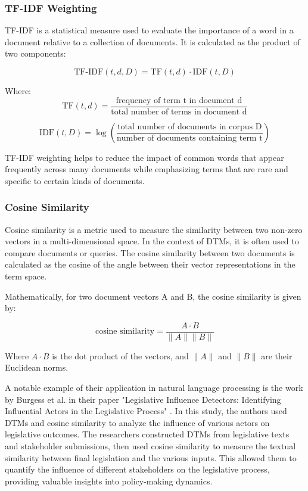 \documentclass[a4paper, oneside]{discothesis}
\begin{document}
\subsubsection{TF-IDF Weighting}
TF-IDF is a statistical measure used to evaluate the importance of a word in a document relative to a collection of documents. It is calculated as the product of two components:

\begin{equation}
\text{TF-IDF}(t,d,D) = \text{TF}(t,d) \cdot \text{IDF}(t,D)
\end{equation}

Where:
\begin{equation}
\text{TF}(t,d) = \frac{\text{frequency of term t in document d}}{\text{total number of terms in document d}}
\end{equation}

\begin{equation}
\text{IDF}(t,D) = \log\left(\frac{\text{total number of documents in corpus D}}{\text{number of documents containing term t}}\right)
\end{equation}

TF-IDF weighting helps to reduce the impact of common words that appear frequently across many documents while emphasizing terms that are rare and specific to certain kinds of documents.

\subsubsection{Cosine Similarity}
Cosine similarity is a metric used to measure the similarity between two non-zero vectors in a multi-dimensional space. In the context of DTMs, it is often used to compare documents or queries. The cosine similarity between two documents is calculated as the cosine of the angle between their vector representations in the term space.

Mathematically, for two document vectors A and B, the cosine similarity is given by:

\begin{equation}
\text{cosine similarity} = \frac{A \cdot B}{\|A\| \|B\|}
\end{equation}

Where $A \cdot B$ is the dot product of the vectors, and $\|A\|$ and $\|B\|$ are their Euclidean norms.

A notable example of their application in natural language processing is the work by Burgess et al. in their paper "Legislative Influence Detectors: Identifying Influential Actors in the Legislative Process" \cite{burgess2016legislative}. In this study, the authors used DTMs and cosine similarity to analyze the influence of various actors on legislative outcomes.
The researchers constructed DTMs from legislative texts and stakeholder submissions, then used cosine similarity to measure the textual similarity between final legislation and the various inputs. This allowed them to quantify the influence of different stakeholders on the legislative process, providing valuable insights into policy-making dynamics.
\end{document}
